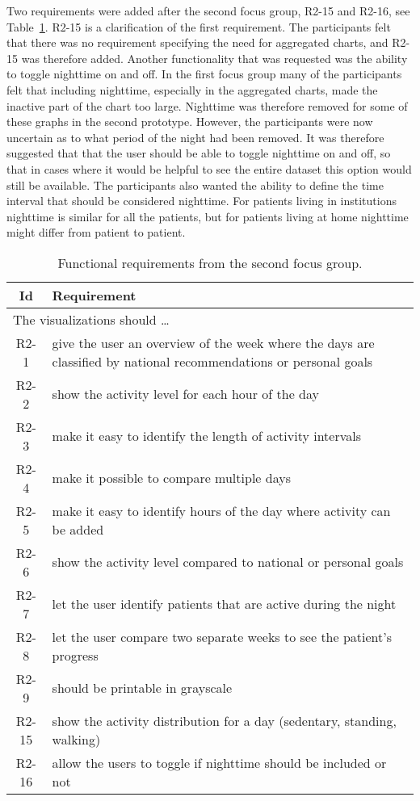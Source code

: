 Two requirements were added after the second focus group, R2-15 and R2-16, see Table~\ref{tab:f2Req}. R2-15 is a clarification of the first requirement. The participants felt that there was no requirement specifying the need for aggregated charts, and R2-15 was therefore added. Another functionality that was requested was the ability to toggle nighttime on and off. In the first focus group many of the participants felt that including nighttime, especially in the aggregated charts, made the inactive part of the chart too large. Nighttime was therefore removed for some of these graphs in the second prototype. However, the participants were now uncertain as to what period of the night had been removed. It was therefore suggested that that the user should be able to toggle nighttime on and off, so that in cases where it would be helpful to see the entire dataset this option would still be available. The participants also wanted the ability to define the time interval that should be considered  nighttime. For patients living in institutions nighttime is similar for all the patients, but for patients living at home nighttime might differ from patient to patient.

\begin{table}[h!]
  \begin{center}
  \begin{tabular}{|c|p{12cm}|}
    \hline
      \textbf{Id} & \textbf{Requirement} \\ \hline
    \multicolumn{2}{|l|}{The visualizations should \ldots} \\ \hline
      R2-1 & give the user an overview of the week where the days are classified by national recommendations or personal goals \\ \hline
      R2-2 & show the activity level for each hour of the day \\ \hline
      R2-3 & make it easy to identify the length of activity intervals \\ \hline
      R2-4 & make it possible to compare multiple days \\ \hline
      R2-5 & make it easy to identify hours of the day where activity can be added \\ \hline
      R2-6 & show the activity level compared to national or personal goals \\ \hline
      R2-7 & let the user identify patients that are active during the night \\ \hline
      R2-8 & let the user compare two separate weeks to see the patient's progress \\ \hline
      R2-9 & should be printable in grayscale \\ \hline
      R2-15 & show the activity distribution for a day (sedentary, standing, walking) \\ \hline
      R2-16 & allow the users to toggle if nighttime should be included or not \\ \hline
  \end{tabular}
  \end{center}
  \caption[Functional requirements after the second focus group.]{Functional requirements from the second focus group.}
  \label{tab:f2Req}
\end{table}

